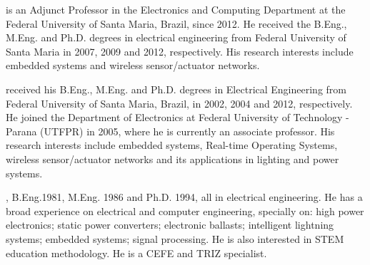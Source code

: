 \documentclass[final,authoryear,3p,twocolumn]{elsarticle}
\begin{document}

\newpage

 is an Adjunct Professor in the Electronics and Computing Department at the Federal University of Santa Maria, Brazil, since 2012. He received the B.Eng., M.Eng. and Ph.D. degrees in electrical engineering from Federal University of Santa Maria in 2007, 2009 and 2012, respectively. His research interests include embedded systems and wireless sensor/actuator networks.\newline

received his B.Eng., M.Eng. and Ph.D. degrees in Electrical Engineering from Federal University of Santa Maria, Brazil, in 2002, 2004 and 2012, respectively. He joined the Department of Electronics at Federal University of Technology - Parana (UTFPR) in 2005, where he is currently an associate professor. His research interests include embedded systems, Real-time Operating Systems, wireless sensor/actuator networks and its applications in lighting and power systems.\newline

, B.Eng.1981, M.Eng. 1986 and Ph.D. 1994, all in electrical engineering. He has a broad experience on electrical and computer engineering, specially on: high power electronics; static power converters; electronic ballasts; intelligent lightning systems; embedded systems; signal processing. He is also interested in STEM education methodology. He is a CEFE and TRIZ specialist.
\end{document}
